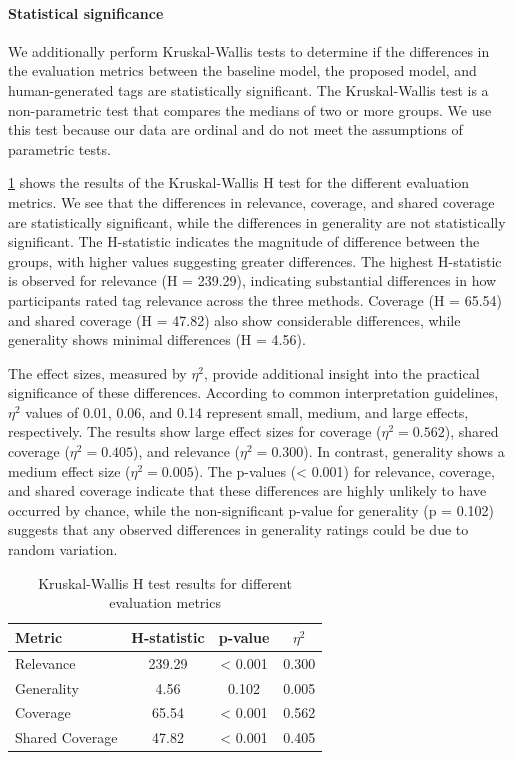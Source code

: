 \paragraph{Statistical significance}
We additionally perform Kruskal-Wallis tests to determine if the differences in the evaluation metrics between the baseline model, the proposed model, and human-generated tags are statistically significant. The Kruskal-Wallis test is a non-parametric test that compares the medians of two or more groups. We use this test because our data are ordinal and do not meet the assumptions of parametric tests.

\cref{tab:kruskal_wallis} shows the results of the Kruskal-Wallis H test for the different evaluation metrics. We see that the differences in relevance, coverage, and shared coverage are statistically significant, while the differences in generality are not statistically significant. The H-statistic indicates the magnitude of difference between the groups, with higher values suggesting greater differences. The highest H-statistic is observed for relevance (H = 239.29), indicating substantial differences in how participants rated tag relevance across the three methods. Coverage (H = 65.54) and shared coverage (H = 47.82) also show considerable differences, while generality shows minimal differences (H = 4.56).

The effect sizes, measured by $\eta^2$, provide additional insight into the practical significance of these differences. According to common interpretation guidelines, $\eta^2$ values of 0.01, 0.06, and 0.14 represent small, medium, and large effects, respectively. The results show large effect sizes for coverage ($\eta^2 = 0.562$), shared coverage ($\eta^2 = 0.405$), and relevance ($\eta^2 = 0.300$). In contrast, generality shows a medium effect size ($\eta^2 = 0.005$). The p-values (< 0.001) for relevance, coverage, and shared coverage indicate that these differences are highly unlikely to have occurred by chance, while the non-significant p-value for generality (p = 0.102) suggests that any observed differences in generality ratings could be due to random variation.

\begin{table}[h]
    \centering
    \begin{tabular}{lccc}
        \hline
        \textbf{Metric} & \textbf{H-statistic} & \textbf{p-value} & \textbf{$\eta^2$} \\
        \hline
        Relevance       & 239.29               & < 0.001          & 0.300             \\
        Generality      & 4.56                 & 0.102            & 0.005             \\
        Coverage        & 65.54                & < 0.001          & 0.562             \\
        Shared Coverage & 47.82                & < 0.001          & 0.405             \\
        \hline
    \end{tabular}
    \caption{Kruskal-Wallis H test results for different evaluation metrics}
    \label{tab:kruskal_wallis}
\end{table}

